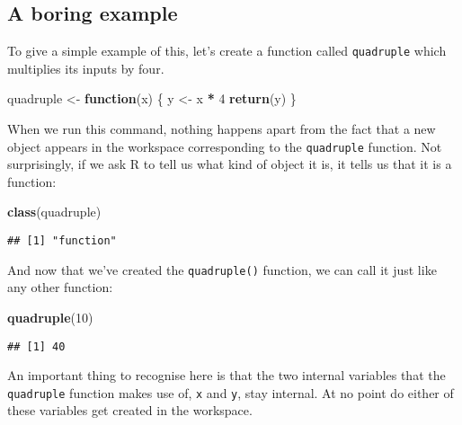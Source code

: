 \documentclass[]{book}
\newenvironment{Shaded}{\begin{snugshade}}{\end{snugshade}}
\newcommand{\ControlFlowTok}[1]{\textcolor[rgb]{0.13,0.29,0.53}{\textbf{#1}}}
\newcommand{\DecValTok}[1]{\textcolor[rgb]{0.00,0.00,0.81}{#1}}
\newcommand{\KeywordTok}[1]{\textcolor[rgb]{0.13,0.29,0.53}{\textbf{#1}}}
\newcommand{\NormalTok}[1]{#1}
\newcommand{\OperatorTok}[1]{\textcolor[rgb]{0.81,0.36,0.00}{\textbf{#1}}}
\newcommand{\StringTok}[1]{\textcolor[rgb]{0.31,0.60,0.02}{#1}}
\begin{document}
\hypertarget{a-boring-example}{%
\subsection{A boring example}\label{a-boring-example}}

To give a simple example of this, let's create a function called \texttt{quadruple} which multiplies its inputs by four.

\begin{Shaded}
\begin{Highlighting}[]
\NormalTok{quadruple <-}\StringTok{ }\ControlFlowTok{function}\NormalTok{(x) \{}
\NormalTok{  y <-}\StringTok{ }\NormalTok{x }\OperatorTok{*}\StringTok{ }\DecValTok{4}
  \KeywordTok{return}\NormalTok{(y)}
\NormalTok{\}}
\end{Highlighting}
\end{Shaded}

When we run this command, nothing happens apart from the fact that a new object appears in the workspace corresponding to the \texttt{quadruple} function. Not surprisingly, if we ask R to tell us what kind of object it is, it tells us that it is a function:

\begin{Shaded}
\begin{Highlighting}[]
\KeywordTok{class}\NormalTok{(quadruple)}
\end{Highlighting}
\end{Shaded}

\begin{verbatim}
## [1] "function"
\end{verbatim}

And now that we've created the \texttt{quadruple()} function, we can call it just like any other function:

\begin{Shaded}
\begin{Highlighting}[]
\KeywordTok{quadruple}\NormalTok{(}\DecValTok{10}\NormalTok{)}
\end{Highlighting}
\end{Shaded}

\begin{verbatim}
## [1] 40
\end{verbatim}

An important thing to recognise here is that the two internal variables that the \texttt{quadruple} function makes use of, \texttt{x} and \texttt{y}, stay internal. At no point do either of these variables get created in the workspace.
\end{document}
